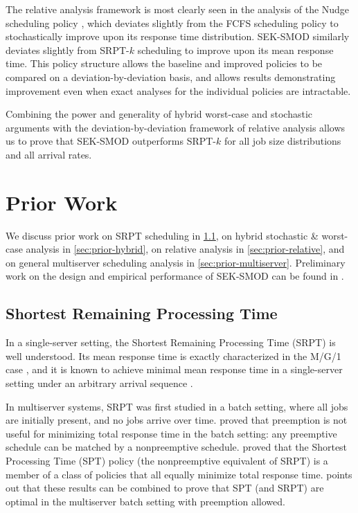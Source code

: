 \documentclass[acmsmall]{acmart}
\begin{document}
The relative analysis framework is most clearly seen in the analysis of the Nudge scheduling policy \cite{grosof-etal-nudge-2021},
which deviates slightly from the FCFS scheduling policy to stochastically improve upon its response time distribution.
SEK-SMOD similarly deviates slightly from SRPT-$k$ scheduling
to improve upon its mean response time.
This policy structure allows the baseline and improved policies to be compared on a deviation-by-deviation basis, and allows results demonstrating improvement even when exact analyses for the individual policies are intractable.

Combining the power and generality of hybrid worst-case and stochastic arguments with the deviation-by-deviation framework of relative analysis allows us to prove that SEK-SMOD outperforms SRPT-$k$ for all job size distributions and all arrival rates.


\section{Prior Work}

We discuss prior work on SRPT scheduling in \cref{sec:prior-srpt},
on hybrid stochastic \& worst-case analysis in \cref{sec:prior-hybrid},
on relative analysis in \cref{sec:prior-relative},
and
on general multiserver scheduling analysis in \cref{sec:prior-multiserver}. Preliminary work on the design and empirical performance of SEK-SMOD can be found in \cite{izzy-MAMA-SEK}.

\subsection{Shortest Remaining Processing Time}
\label{sec:prior-srpt}

In a single-server setting, the Shortest Remaining Processing Time (SRPT) is well understood. Its mean response time is exactly characterized in the M/G/1 case \cite{schrage-et-al1966srpt-characterize}, and it is known to achieve minimal mean response time in a single-server setting under an arbitrary arrival sequence \cite{schrage1968proof-srpt-opt}.

In multiserver systems, SRPT was first studied in a batch setting, where all jobs are initially present, and no jobs arrive over time. \citet{mcnaughton1959scheduling} proved that preemption is not useful for minimizing total response time in the batch setting: any preemptive schedule can be matched by a nonpreemptive schedule.
\citet{conway1967miller} proved that the Shortest Processing Time (SPT) policy (the nonpreemptive equivalent of SRPT) 
is a member of a class of policies that all equally minimize total response time.
\citet[Section~4.4.1]{graham1979optimization} points out that these results can be combined to prove that SPT (and SRPT) are optimal in the multiserver batch setting with preemption allowed.
\end{document}
